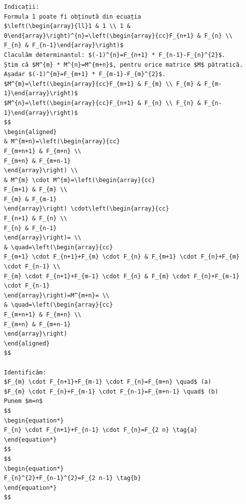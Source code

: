 \documentclass[10pt]{article}
\begin{document}
\begin{verbatim}
Indicații:
Formula 1 poate fi obținută din ecuația
$\left(\begin{array}{ll}1 & 1 \\ 1 & 0\end{array}\right)^{n}=\left(\begin{array}{cc}F_{n+1} & F_{n} \\ F_{n} & F_{n-1}\end{array}\right)$
Claculăm determinantul: $(-1)^{n}=F_{n+1} * F_{n-1}-F_{n}^{2}$.
Știm că $M^{m} * M^{n}=M^{m+n}$, pentru orice matrice $M$ pătratică.
Așadar $(-1)^{m}=F_{m+1} * F_{m-1}-F_{m}^{2}$.
$M^{m}=\left(\begin{array}{cc}F_{m+1} & F_{m} \\ F_{m} & F_{m-1}\end{array}\right)$
$M^{n}=\left(\begin{array}{cc}F_{n+1} & F_{n} \\ F_{n} & F_{n-1}\end{array}\right)$
$$
\begin{aligned}
& M^{m+n}=\left(\begin{array}{cc}
F_{m+n+1} & F_{m+n} \\
F_{m+n} & F_{m+n-1}
\end{array}\right) \\
& M^{m} \cdot M^{m}=\left(\begin{array}{cc}
F_{m+1} & F_{m} \\
F_{m} & F_{m-1}
\end{array}\right) \cdot\left(\begin{array}{cc}
F_{n+1} & F_{n} \\
F_{n} & F_{n-1}
\end{array}\right)= \\
& \quad=\left(\begin{array}{cc}
F_{m+1} \cdot F_{n+1}+F_{m} \cdot F_{n} & F_{m+1} \cdot F_{n}+F_{m} \cdot F_{n-1} \\
F_{m} \cdot F_{n+1}+F_{m-1} \cdot F_{n} & F_{m} \cdot F_{n}+F_{m-1} \cdot F_{n-1}
\end{array}\right)=M^{m+n}= \\
& \quad=\left(\begin{array}{cc}
F_{m+n+1} & F_{m+n} \\
F_{m+n} & F_{m+n-1}
\end{array}\right)
\end{aligned}
$$

Identificăm:
$F_{m} \cdot F_{n+1}+F_{m-1} \cdot F_{n}=F_{m+n} \quad$ (a)
$F_{m} \cdot F_{n}+F_{m-1} \cdot F_{n-1}=F_{m+n-1} \quad$ (b)
Punem $m=n$
$$
\begin{equation*}
F_{n} \cdot F_{n+1}+F_{n-1} \cdot F_{n}=F_{2 n} \tag{a}
\end{equation*}
$$
$$
\begin{equation*}
F_{n}^{2}+F_{n-1}^{2}=F_{2 n-1} \tag{b}
\end{equation*}
$$


\end{verbatim}
\end{document}
